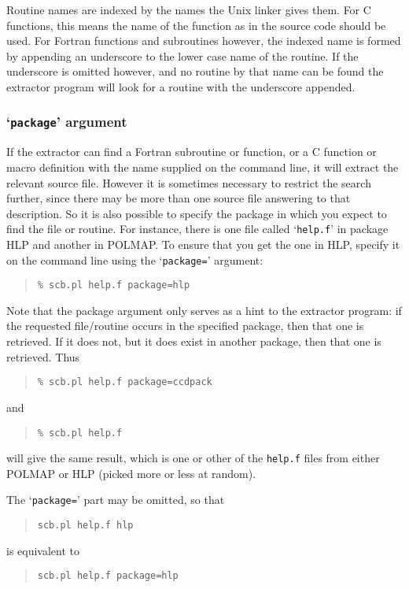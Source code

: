 \documentclass[twoside,11pt]{article}
\renewcommand{\_}{\texttt{\symbol{95}}}
\begin{document}
Routine names are indexed by the names the Unix linker gives them.
For C functions, this means the name of the function as in the 
source code should be used.
For Fortran functions and subroutines however, the indexed name is 
formed by appending an underscore to the lower case name of the 
routine.  
If the underscore is omitted however, and no routine by that name
can be found the extractor program will look for a routine with
the underscore appended.


\subsubsection{`{\tt package}' argument}

If the extractor can find a Fortran subroutine or function, 
or a C function or macro definition with the name supplied on
the command line, it will extract the relevant source file.
However it is sometimes necessary to restrict the search
further, since there may be more than one source file answering
to that description.  So it is also possible to specify the
package in which you expect to find the file or routine. 
For instance, there is one file called `{\tt help.f}' in
package HLP and another in POLMAP.  
To ensure that you get the one in HLP, specify it on the 
command line using the `{\tt package=}' argument:
\begin{quote}
\begin{verbatim}
% scb.pl help.f package=hlp
\end{verbatim}
\end{quote}
Note that the package argument only serves as a hint to the
extractor program: if the requested file/routine occurs in the
specified package, then that one is retrieved.  If it does not,
but it does exist in another package, then that one is retrieved.
Thus
\begin{quote}
\begin{verbatim}
% scb.pl help.f package=ccdpack
\end{verbatim}
\end{quote}
and 
\begin{quote}
\begin{verbatim}
% scb.pl help.f
\end{verbatim}
\end{quote}
will give the same result, which is one or other of the {\tt help.f}
files from either POLMAP or HLP (picked more or less at random).

The `{\tt package=}' part may be omitted, so that 
\begin{quote}
\begin{verbatim}
scb.pl help.f hlp
\end{verbatim}
\end{quote}
is equivalent to 
\begin{quote}
\begin{verbatim}
scb.pl help.f package=hlp
\end{verbatim}
\end{quote}
\end{document}
